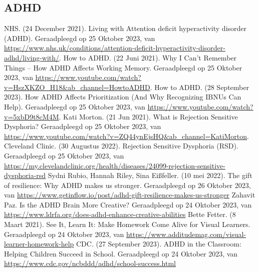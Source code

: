 \begin{thebibliography}{9}
        \item[\bigskip\subsection*{ADHD}]
                NHS. (24 December 2021). Living with Attention deficit hyperactivity disorder (ADHD). Geraadpleegd op 25 Oktober 2023, van \url{https://www.nhs.uk/conditions/attention-deficit-hyperactivity-disorder-adhd/living-with/}.
                How to ADHD. (22 Juni 2021). Why I Can't Remember Things -- How ADHD Affects Working Memory. Geraadpleegd op 25 Oktober 2023, van \url{https://www.youtube.com/watch?v=HszXKZO_H18&ab_channel=HowtoADHD}.
                How to ADHD. (28 September 2023). How ADHD Affects Prioritization (And Why Recognizing IBNUs Can Help). Geraadpleegd op 25 Oktober 2023, van \url{https://www.youtube.com/watch?v=5xbD9t8cM4M}.
                Kati Morton. (21 Jun 2021). What is Rejection Sensitive Dysphoria? Geraadpleegd op 25 Oktober 2023, van \url{https://www.youtube.com/watch?v=ZQ44ynEjsHQ&ab_channel=KatiMorton}.
                Cleveland Clinic. (30 Augustus 2022). Rejection Sensitive Dysphoria (RSD). Geraadpleegd op 25 Oktober 2023, van \url{https://my.clevelandclinic.org/health/diseases/24099-rejection-sensitive-dysphoria-rsd}
                Sydni Rubio, Hannah Riley, Sina Eißfeller. (10 mei 2022). The gift of resilience: Why ADHD makes us stronger. Geraadpleegd op 26 Oktober 2023, van \url{https://www.getinflow.io/post/adhd-gift-resilience-makes-us-stronger}
                Zahavit Paz. Is the ADHD Brain More Creative? Geraadpleegd op 24 Oktober 2023, van \url{https://www.ldrfa.org/does-adhd-enhance-creative-abilities}
                Bette Fetter. (8 Maart 2021). See It, Learn It: Make Homework Come Alive for Visual Learners. Geraadpleegd op 24 Oktober 2023, van \url{https://www.additudemag.com/visual-learner-homework-help}
                CDC. (27 September 2023). ADHD in the Classroom: Helping Children Succeed in School. Geraadpleegd op 24 Oktober 2023, van \url{https://www.cdc.gov/ncbddd/adhd/school-success.html}

\end{thebibliography}
